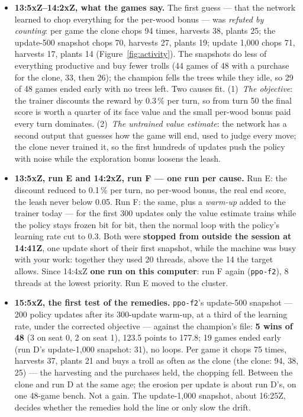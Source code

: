 \documentclass[11pt,a4paper]{article}
\begin{document}
\begin{itemize}[nosep,leftmargin=1.4em]
  \item \textbf{13:5xZ--14:2xZ, what the games say.} The first guess --- that the network learned to chop everything for the per-wood bonus --- was \emph{refuted by counting}: per game the clone chops 94 times, harvests 38, plants 25; the update-500 snapshot chops 70, harvests 27, plants 19; update 1,000 chops 71, harvests 17, plants 14 (Figure~\ref{fig:activity}). The snapshots do less of everything productive and buy fewer trolls (44 games of 48 with a purchase for the clone, 33, then 26); the champion fells the trees while they idle, so 29 of 48 games ended early with no trees left. Two causes fit. (1)~\emph{The objective}: the trainer discounts the reward by 0.3\,\% per turn, so from turn 50 the final score is worth a quarter of its face value and the small per-wood bonus paid every turn dominates. (2)~\emph{The untrained value estimate}: the network has a second output that guesses how the game will end, used to judge every move; the clone never trained it, so the first hundreds of updates push the policy with noise while the exploration bonus loosens the leash.
  \item \textbf{13:5xZ, run E and 14:2xZ, run F --- one run per cause.} Run E: the discount reduced to 0.1\,\% per turn, no per-wood bonus, the real end score, the leash never below 0.05. Run F: the same, plus a \emph{warm-up} added to the trainer today --- for the first 300 updates only the value estimate trains while the policy stays frozen bit for bit, then the normal loop with the policy's learning rate cut to 0.3. Both were \textbf{stopped from outside the session at 14:41Z}, one update short of their first snapshot, while the machine was busy with your work: together they used 20 threads, above the 14 the target allows. Since 14:4xZ \textbf{one run on this computer}: run F again (\texttt{ppo-f2}), 8 threads at the lowest priority. Run E moved to the cluster.
  \item \textbf{15:5xZ, the first test of the remedies.} \texttt{ppo-f2}'s update-500 snapshot --- 200 policy updates after its 300-update warm-up, at a third of the learning rate, under the corrected objective --- against the champion's file: \textbf{5 wins of 48} (3 on seat 0, 2 on seat 1), 123.5 points to 177.8; 19 games ended early (run D's update-1,000 snapshot: 31), no loops. Per game it chops 75 times, harvests 37, plants 21 and buys a troll as often as the clone (the clone: 94, 38, 25) --- the harvesting and the purchases held, the chopping fell. Between the clone and run D at the same age; the erosion per update is about run D's, on one 48-game bench. Not a gain. The update-1,000 snapshot, about 16:25Z, decides whether the remedies hold the line or only slow the drift.
\end{itemize}
\end{document}
